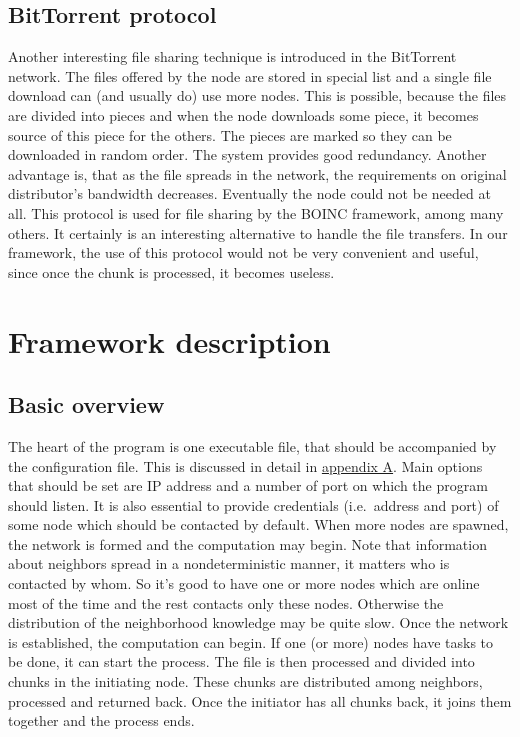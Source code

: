 \subsection{BitTorrent protocol}\label{bittorrent-protocol}

Another interesting file sharing technique is introduced in the
BitTorrent network. The files offered by the node are stored in special
list and a single file download can (and usually do) use more nodes.
This is possible, because the files are divided into pieces and when the
node downloads some piece, it becomes source of this piece for the
others. The pieces are marked so they can be downloaded in random order.
The system provides good redundancy. Another advantage is, that as the
file spreads in the network, the requirements on original distributor's
bandwidth decreases. Eventually the node could not be needed at all.
This protocol is used for file sharing by the BOINC framework, among
many others. It certainly is an interesting alternative to handle the
file transfers. In our framework, the use of this protocol would not be
very convenient and useful, since once the chunk is processed, it
becomes useless.\citep{BitTor}

\section{Framework description}\label{framework-description}

\subsection{Basic overview}\label{basic-overview}

The heart of the program is one executable file, that should be
accompanied by the configuration file. This is discussed in detail in
\hyperref[installation-and-use]{appendix A}. Main options that should be
set are IP address and a number of port on which the program should
listen. It is also essential to provide credentials (i.e.~address and
port) of some node which should be contacted by default. When more nodes
are spawned, the network is formed and the computation may begin. Note
that information about neighbors spread in a nondeterministic manner, it
matters who is contacted by whom. So it's good to have one or more nodes
which are online most of the time and the rest contacts only these
nodes. Otherwise the distribution of the neighborhood knowledge may be
quite slow. Once the network is established, the computation can begin.
If one (or more) nodes have tasks to be done, it can start the process.
The file is then processed and divided into chunks in the initiating
node. These chunks are distributed among neighbors, processed and
returned back. Once the initiator has all chunks back, it joins them
together and the process ends.

